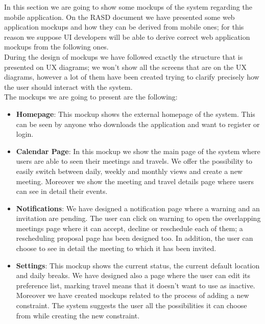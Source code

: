 In this section we are going to show some mockups of the system regarding the mobile application. On the RASD document we have presented some web application mockups and how they can be derived from mobile ones; for this reason we suppose UI developers will be able to derive correct web application mockups from the following ones.\\
During the design of mockups we have followed exactly the structure that is presented on UX diagrams; we won't show all the screens that are on the UX diagrams, however a lot of them have been created trying to clarify precisely how the user should interact with the system.\\
The mockups we are going to present are the following:
\begin{itemize}
	\item \textbf{Homepage}: This mockup shows the external homepage of the system. This can be seen by anyone who downloads the application and want to register or login.
	\item \textbf{Calendar Page}: In this mockup we show the main page of the system where users are able to seen their meetings and travels. We offer the possibility to easily switch between daily, weekly and monthly views and create a new meeting. Moreover we show the meeting and travel details page where users can see in detail their events.
	\item \textbf{Notifications}: We have designed a notification page where a warning and an invitation are pending. The user can click on warning to open the overlapping meetings page where it can accept, decline or reschedule each of them; a rescheduling proposal page has been designed too. In addition, the user can choose to see in detail the meeting to which it has been invited.
	\item \textbf{Settings}: This mockup shows the current status, the current default location and daily breaks. We have designed also a page where the user can edit its preference list, marking travel means that it doesn't want to use as inactive. Moreover we have created mockups related to the process of adding a new constraint. The system suggests the user all the possibilities it can choose from while creating the new constraint.
\end{itemize}

